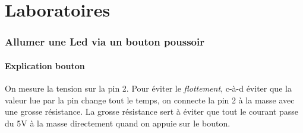 \documentclass[a4paper]{article}
\begin{document}
\part{Laboratoires}















\section{Allumer une Led via un bouton poussoir}










\subsection{Explication bouton}





On mesure la tension sur la pin 2. Pour éviter le \textit{flottement}, c-à-d éviter que la valeur lue par la pin change tout le temps, on connecte la pin 2 à la masse avec une grosse résistance. La grosse résistance sert à éviter que tout le courant passe du 5V à la masse directement quand on appuie sur le bouton.
\end{document}

